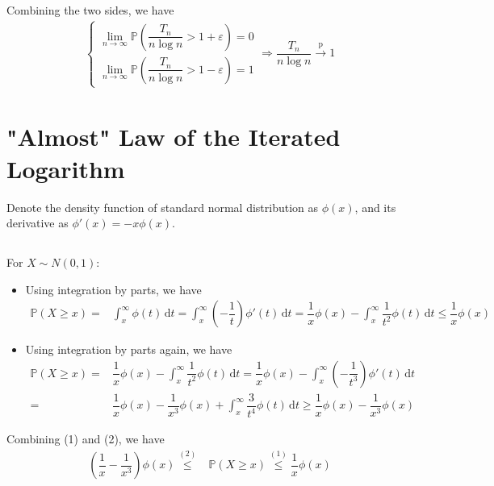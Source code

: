 \documentclass[11pt,a4paper]{article}
\numberwithin{equation}{section}%
\begin{document}
Combining the two sides, we have
\begin{align*}
    \begin{cases}
        \lim_{n\to\infty} \mathbb{P}\left( \dfrac{ T_n }{ n\log n } > 1+\varepsilon   \right) = 0\\
        \lim_{n\to\infty} \mathbb{P}\left( \dfrac{ T_n }{ n\log n } > 1-\varepsilon   \right) = 1
    \end{cases}  \Rightarrow \dfrac{ T_n }{ n\log n }\xrightarrow[]{\mathrm{p}} 1 
\end{align*}



\section{"Almost" Law of the Iterated Logarithm}

Denote the density function of standard normal distribution as $ \phi(x) $, and its derivative as $ \phi'(x)=-x\phi(x) $.

\subsection{}
For $ X\sim N(0,1) $:
\begin{itemize}[topsep=2pt,itemsep=0pt]
    \item Using integration by parts, we have
    \begin{align*}
        \mathbb{P}\left( X\geq x \right) =& \int_x^\infty \phi(t)\,\mathrm{d}t = \int _x^\infty (-\dfrac{ 1 }{ t } ) \phi '(t) \,\mathrm{d}t = \dfrac{ 1 }{ x } \phi(x) - \int _x^\infty \dfrac{ 1 }{ t^2 } \phi (t ) \,\mathrm{d}t \leq  \dfrac{ 1 }{ x } \phi(x) \tag{1}
    \end{align*}
    \item Using integration by parts again, we have
    \begin{align*}
        \mathbb{P}\left( X\geq x \right) =&\dfrac{ 1 }{ x } \phi(x) - \int _x^\infty \dfrac{ 1 }{ t^2 } \phi (t ) \,\mathrm{d}t = \dfrac{ 1 }{ x } \phi(x) -\int _x^\infty (-\dfrac{ 1 }{ t^3 }) \phi' (t ) \,\mathrm{d}t \\=& \dfrac{ 1 }{ x } \phi(x) - \dfrac{ 1 }{ x^3 } \phi(x) + \int _x^\infty \dfrac{ 3 }{ t^4 } \phi (t ) \,\mathrm{d}t \geq  \dfrac{ 1 }{ x } \phi(x) - \dfrac{ 1 }{ x^3 } \phi(x) \tag{2}
    \end{align*}
\end{itemize}
Combining (1) and (2), we have
\begin{align*}
    \left(\dfrac{ 1 }{ x } - \dfrac{ 1 }{ x^3 }\right) \phi(x) \mathop{ \leq  }\limits^{(2)} & \mathbb{P}\left( X\geq x \right) \mathop{ \leq  }\limits^{(1)} \dfrac{ 1 }{ x } \phi(x) 
\end{align*}
\end{document}
